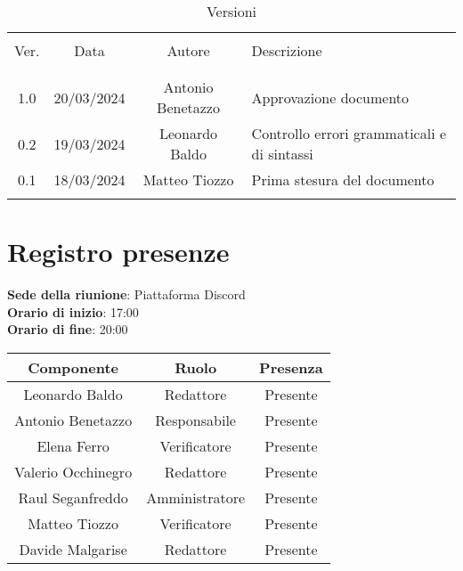 \documentclass[italian,12pt]{article} %
\begin{document}


\newpage





\begin{table}[!h]
	\caption{Versioni}
	\begin{center}
		\begin{tabular}{ c c c p{9cm}}
			\hline \\[-2ex]
			Ver. & Data & Autore & Descrizione \\
			\\[-2ex] \hline \\[-1.5ex]	
			1.0 & 20/03/2024 & Antonio Benetazzo & Approvazione documento \\
			0.2 & 19/03/2024 & Leonardo Baldo & Controllo errori grammaticali e di sintassi \\
			0.1 & 18/03/2024 & Matteo Tiozzo & Prima stesura del documento \\
			\\[-1.5ex] \hline
		\end{tabular}
	\end{center}
\end{table}
\newpage

\tableofcontents

\newpage

\section{Registro presenze}


\textbf{Sede della riunione}: Piattaforma Discord\\
\textbf{Orario di inizio}: 17:00\\
\textbf{Orario di fine}: 20:00\\

\begin{flushleft}
\begin{table}[!h]
\begin{tabular}{ |c|c|c| } 
	\hline
	\textbf{Componente} & \textbf{Ruolo} & \textbf{Presenza} \\
	\hline 
	Leonardo Baldo 		& Redattore & Presente \\ 
	Antonio Benetazzo 	& Responsabile & Presente \\
	Elena Ferro 		& Verificatore & Presente \\
	Valerio Occhinegro 	& Redattore & Presente \\
	Raul Seganfreddo 	& Amministratore & Presente \\
	Matteo Tiozzo 		& Verificatore & Presente \\ 
	Davide Malgarise 	& Redattore & Presente \\
	\hline
\end{tabular}
\end{table}
\end{flushleft}
\end{document}
